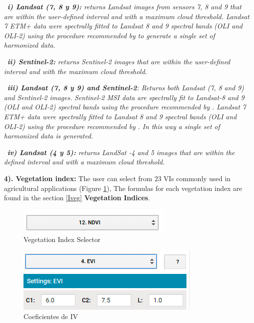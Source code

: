 \documentclass[
]{book}
\begin{document}
~\emph{\textbf{i) Landsat (7, 8 y 9):} returns Landsat images from sensors 7, 8 and 9 that are within the user-defined interval and with a maximum cloud threshold. Landsat 7 ETM+ data were spectrally fitted to Landsat 8 and 9 spectral bands (OLI and OLI-2) using the procedure recommended by \citep{Roy2016} to generate a single set of harmonized data.}

~\emph{\textbf{ii) Sentinel-2:} returns Sentinel-2 images that are within the user-defined interval and with the maximum cloud threshold.}

~\emph{\textbf{iii) Landsat (7, 8 y 9) and Sentinel-2}: Returns both Landsat (7, 8 and 9) and Sentinel-2 images. Sentinel-2 MSI data are spectrally fit to Landsat-8 and 9 (OLI and OLI-2) spectral bands using the procedure recommended by \citep{Claverie2018}. Landsat 7 ETM+ data were spectrally fitted to Landsat 8 and 9 spectral bands (OLI and OLI-2) using the procedure recommended by \citep{Roy2016}. In this way a single set of harmonized data is generated.}

~\emph{\textbf{iv) Landsat (4 y 5):} returns LandSat -4 and 5 images that are within the defined interval and with a maximum cloud threshold.}

\textbf{4). Vegetation index: } The user can select from 23 VIs commonly used in agricultural applications (Figure \ref{fig:figG4}), The formulas for each vegetation index are found in the section \ref{Iveg} \textbf{Vegetation Indices}.

\begin{figure}

{\centering \includegraphics{./images/Figure5} 

}

\caption{Vegetation Index Selector}\label{fig:figG4}
\end{figure}

\begin{figure}

{\centering \includegraphics{./images/Figure5.1} 

}

\caption{Coeficientes de IV}\label{fig:figG5}
\end{figure}
\end{document}
